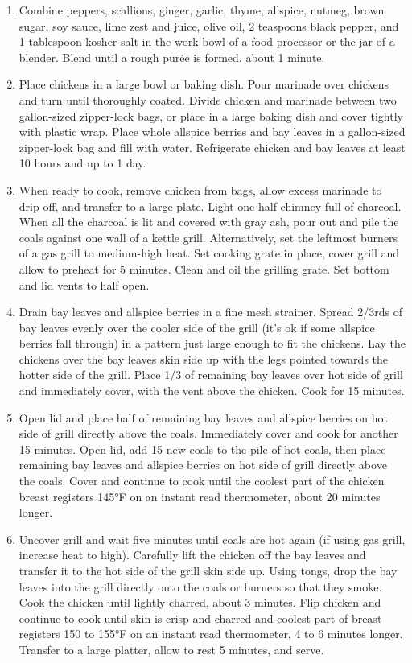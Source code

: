 \documentclass[
]{article}
\begin{document}
\begin{enumerate}
\def\labelenumi{\arabic{enumi}.}
\item
  Combine peppers, scallions, ginger, garlic, thyme, allspice, nutmeg, brown sugar, soy sauce, lime zest and juice, olive oil, 2 teaspoons black pepper, and 1 tablespoon kosher salt in the work bowl of a food processor or the jar of a blender. Blend until a rough purée is formed, about 1 minute.
\item
  Place chickens in a large bowl or baking dish. Pour marinade over chickens and turn until thoroughly coated. Divide chicken and marinade between two gallon-sized zipper-lock bags, or place in a large baking dish and cover tightly with plastic wrap. Place whole allspice berries and bay leaves in a gallon-sized zipper-lock bag and fill with water. Refrigerate chicken and bay leaves at least 10 hours and up to 1 day.
\item
  When ready to cook, remove chicken from bags, allow excess marinade to drip off, and transfer to a large plate. Light one half chimney full of charcoal. When all the charcoal is lit and covered with gray ash, pour out and pile the coals against one wall of a kettle grill. Alternatively, set the leftmost burners of a gas grill to medium-high heat. Set cooking grate in place, cover grill and allow to preheat for 5 minutes. Clean and oil the grilling grate. Set bottom and lid vents to half open.
\item
  Drain bay leaves and allspice berries in a fine mesh strainer. Spread 2/3rds of bay leaves evenly over the cooler side of the grill (it's ok if some allspice berries fall through) in a pattern just large enough to fit the chickens. Lay the chickens over the bay leaves skin side up with the legs pointed towards the hotter side of the grill. Place 1/3 of remaining bay leaves over hot side of grill and immediately cover, with the vent above the chicken. Cook for 15 minutes.
\item
  Open lid and place half of remaining bay leaves and allspice berries on hot side of grill directly above the coals. Immediately cover and cook for another 15 minutes. Open lid, add 15 new coals to the pile of hot coals, then place remaining bay leaves and allspice berries on hot side of grill directly above the coals. Cover and continue to cook until the coolest part of the chicken breast registers 145°F on an instant read thermometer, about 20 minutes longer.
\item
  Uncover grill and wait five minutes until coals are hot again (if using gas grill, increase heat to high). Carefully lift the chicken off the bay leaves and transfer it to the hot side of the grill skin side up. Using tongs, drop the bay leaves into the grill directly onto the coals or burners so that they smoke. Cook the chicken until lightly charred, about 3 minutes. Flip chicken and continue to cook until skin is crisp and charred and coolest part of breast registers 150 to 155°F on an instant read thermometer, 4 to 6 minutes longer. Transfer to a large platter, allow to rest 5 minutes, and serve.
\end{enumerate}
\end{document}
